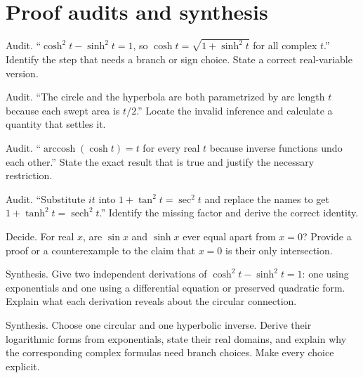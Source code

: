 \documentclass{workbook}
\DeclareMathOperator{\arccosh}{arccosh}
\DeclareMathOperator{\sech}{sech}
\begin{document}
\section{Proof audits and synthesis}

\begin{problem}{Audit.}
``$\cosh^2t-\sinh^2t=1$, so $\cosh t=\sqrt{1+\sinh^2t}$ for
all complex $t$.'' Identify the step that needs a branch or sign
choice. State a correct real-variable version.
\end{problem}

\begin{problem}{Audit.}
``The circle and the hyperbola are both parametrized by arc length
$t$ because each swept area is $t/2$.'' Locate the invalid inference
and calculate a quantity that settles it.
\end{problem}

\begin{problem}{Audit.}
``$\arccosh(\cosh t)=t$ for every real $t$ because inverse
functions undo each other.'' State the exact result that is true
and justify the necessary restriction.
\end{problem}

\begin{problem}{Audit.}
``Substitute $it$ into $1+\tan^2t=\sec^2t$ and replace the names
to get $1+\tanh^2t=\sech^2t$.'' Identify the missing factor and
derive the correct identity.
\end{problem}

\begin{problem}{Decide.}
For real $x$, are $\sin x$ and $\sinh x$ ever equal apart from
$x=0$? Provide a proof or a counterexample to the claim that
$x=0$ is their only intersection.
\end{problem}

\begin{problem}{Synthesis.}
Give two independent derivations of
$\cosh^2t-\sinh^2t=1$: one using exponentials and one using a
differential equation or preserved quadratic form. Explain what
each derivation reveals about the circular connection.
\end{problem}

\begin{problem}{Synthesis.}
Choose one circular and one hyperbolic inverse. Derive their
logarithmic forms from exponentials, state their real domains,
and explain why the corresponding complex formulas need branch
choices. Make every choice explicit.
\end{problem}
\end{document}
